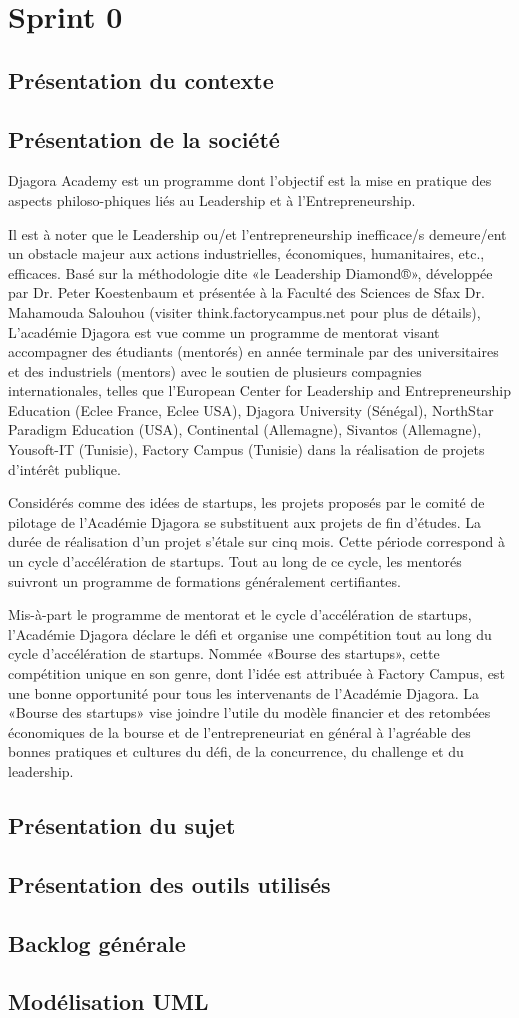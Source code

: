 \section{Sprint 0}
\subsection{Présentation du contexte}

\subsection{Présentation de la société}
Djagora Academy est un programme dont l’objectif est la mise en pratique des 
aspects  philoso-phiques liés au Leadership et à l’Entrepreneurship.

Il est à noter que le Leadership ou/et l’entrepreneurship inefficace/s demeure/ent un obstacle 
majeur aux actions industrielles, économiques, humanitaires, etc., efficaces. 
Basé sur la méthodologie dite «le Leadership Diamond®», développée par
Dr. Peter Koestenbaum et présentée à la Faculté des Sciences de Sfax Dr. Mahamouda
Salouhou (visiter think.factorycampus.net pour plus de détails), L’académie 
Djagora est vue comme un programme de mentorat visant accompagner des étudiants 
(mentorés) en année terminale par des universitaires et des industriels (mentors) 
avec le soutien de plusieurs compagnies internationales, telles que l’European 
Center for Leadership and Entrepreneurship Education (Eclee France, Eclee USA), 
Djagora University (Sénégal), NorthStar Paradigm Education (USA), Continental 
(Allemagne), Sivantos (Allemagne), Yousoft-IT (Tunisie), Factory Campus (Tunisie)
dans la réalisation de projets d’intérêt publique.

Considérés comme des idées de startups, les projets proposés par
le comité de pilotage de l'Académie Djagora se substituent aux projets de fin
d’études.
La durée de réalisation d’un projet s’étale sur cinq mois. Cette période
correspond à un cycle d’accélération de startups. Tout au long de ce cycle,
les mentorés suivront un programme de formations généralement certifiantes.

Mis-à-part le programme de mentorat et le cycle d’accélération de startups, 
l’Académie Djagora déclare le défi et organise une compétition tout au long
du cycle d’accélération de startups. Nommée «Bourse des startups», cette 
compétition unique en son genre, dont l’idée est attribuée à Factory Campus,
est une bonne opportunité pour tous les intervenants de l’Académie Djagora.
La «Bourse des startups» vise joindre l’utile du modèle financier et des retombées 
économiques de la bourse et de l’entrepreneuriat en général à l’agréable des 
bonnes pratiques et cultures du défi, de la concurrence, du challenge et du 
leadership. 
\subsection{Présentation du sujet}
\subsection{Présentation des outils utilisés}
\subsection{Backlog générale}
\subsection{Modélisation UML}
